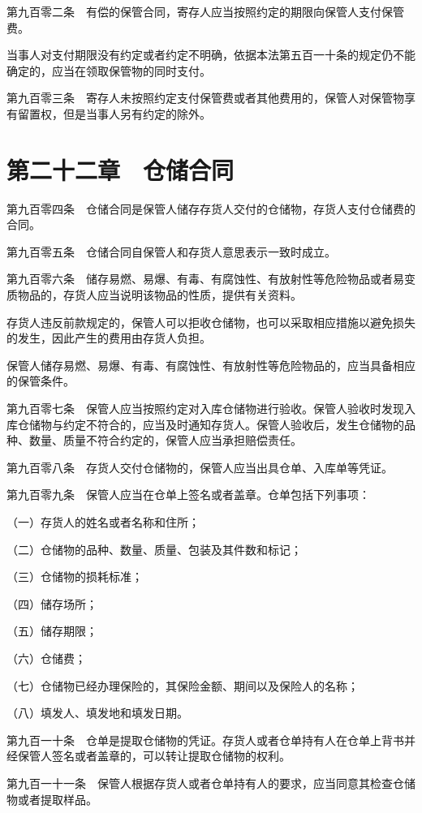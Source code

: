 \documentclass[UTF8,12pt,a4paper]{ctexbook}
\begin{document}
第九百零二条　有偿的保管合同，寄存人应当按照约定的期限向保管人支付保管费。

当事人对支付期限没有约定或者约定不明确，依据本法第五百一十条的规定仍不能确定的，应当在领取保管物的同时支付。

第九百零三条　寄存人未按照约定支付保管费或者其他费用的，保管人对保管物享有留置权，但是当事人另有约定的除外。

\section*{第二十二章　仓储合同}

第九百零四条　仓储合同是保管人储存存货人交付的仓储物，存货人支付仓储费的合同。

第九百零五条　仓储合同自保管人和存货人意思表示一致时成立。

第九百零六条　储存易燃、易爆、有毒、有腐蚀性、有放射性等危险物品或者易变质物品的，存货人应当说明该物品的性质，提供有关资料。

存货人违反前款规定的，保管人可以拒收仓储物，也可以采取相应措施以避免损失的发生，因此产生的费用由存货人负担。

保管人储存易燃、易爆、有毒、有腐蚀性、有放射性等危险物品的，应当具备相应的保管条件。

第九百零七条　保管人应当按照约定对入库仓储物进行验收。保管人验收时发现入库仓储物与约定不符合的，应当及时通知存货人。保管人验收后，发生仓储物的品种、数量、质量不符合约定的，保管人应当承担赔偿责任。

第九百零八条　存货人交付仓储物的，保管人应当出具仓单、入库单等凭证。

第九百零九条　保管人应当在仓单上签名或者盖章。仓单包括下列事项：

（一）存货人的姓名或者名称和住所；

（二）仓储物的品种、数量、质量、包装及其件数和标记；

（三）仓储物的损耗标准；

（四）储存场所；

（五）储存期限；

（六）仓储费；

（七）仓储物已经办理保险的，其保险金额、期间以及保险人的名称；

（八）填发人、填发地和填发日期。

第九百一十条　仓单是提取仓储物的凭证。存货人或者仓单持有人在仓单上背书并经保管人签名或者盖章的，可以转让提取仓储物的权利。

第九百一十一条　保管人根据存货人或者仓单持有人的要求，应当同意其检查仓储物或者提取样品。
\end{document}
